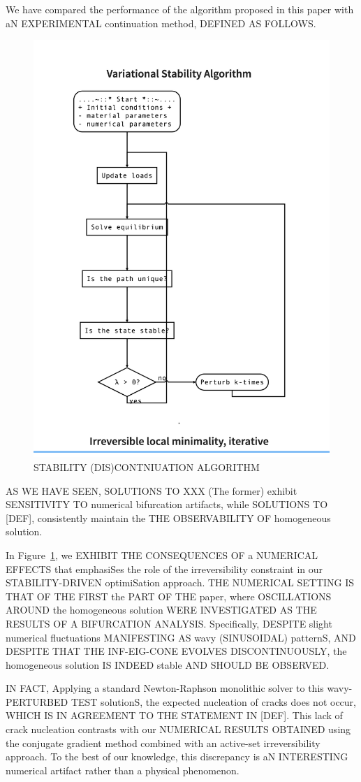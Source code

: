 We have compared the performance of the algorithm proposed in this paper with aN EXPERIMENTAL continuation method, DEFINED AS FOLLOWS. 


\begin{figure}[htbp]
    \centering
    \includegraphics*[width=.7\textwidth]{../images/VSA*.png}
    \caption{STABILITY (DIS)CONTNIUATION ALGORITHM}
    \label{fig:shouldnt}
\end{figure}

AS WE HAVE SEEN, SOLUTIONS TO XXX (The former) exhibit SENSITIVITY TO numerical bifurcation artifacts, while SOLUTIONS TO [DEF], consistently maintain the THE OBSERVABILITY OF homogeneous solution.

In Figure~\ref{fig:shouldnt}, we EXHIBIT THE CONSEQUENCES OF a NUMERICAL EFFECTS that emphasiSes the role of the irreversibility constraint in our STABILITY-DRIVEN optimiSation approach. THE NUMERICAL SETTING IS THAT OF THE FIRST the PART OF THE paper, where OSCILLATIONS AROUND the homogeneous solution WERE INVESTIGATED AS THE RESULTS OF A BIFURCATION ANALYSIS. Specifically, DESPITE slight numerical fluctuations MANIFESTING AS wavy (SINUSOIDAL) patternS, AND DESPITE THAT THE INF-EIG-CONE EVOLVES DISCONTINUOUSLY, the homogeneous solution IS INDEED stable AND SHOULD BE OBSERVED.

IN FACT, Applying a standard Newton-Raphson monolithic solver to this  wavy-PERTURBED TEST solutionS, the expected nucleation of cracks does not occur, WHICH IS IN AGREEMENT TO THE STATEMENT IN [DEF]. This lack of crack nucleation contrasts with our NUMERICAL RESULTS OBTAINED using the conjugate gradient method combined with an active-set irreversibility approach. To the best of our knowledge, this discrepancy is aN INTERESTING numerical artifact rather than a physical phenomenon.

